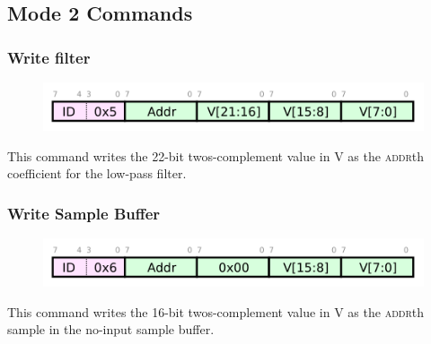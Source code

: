 \subsection{Mode 2 Commands}
\subsubsection{Write filter}
\begin{figure}[h!]
\includegraphics[scale=1.0]{writefil.cmd.svg}
\end{figure}

This command writes the 22-bit twos-complement value in V as the
\textsc{addr}th coefficient for the low-pass filter.

\subsubsection{Write Sample Buffer}
\begin{figure}[h!]
\includegraphics[scale=1.0]{writesamp.cmd.svg}
\end{figure}

This command writes the 16-bit twos-complement value in V as the
\textsc{addr}th sample in the no-input sample buffer.


